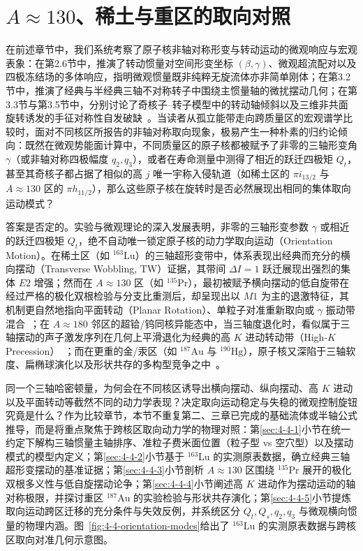 \section{$A\approx 130$、稀土与重区的取向对照}\label{sec:4-4}

在前述章节中，我们系统考察了原子核非轴对称形变与转动运动的微观响应与宏观表象：在第2.6节中，推演了转动惯量对空间形变坐标 $(\beta, \gamma)$、微观超流配对以及四极冻结场的多体响应，指明微观惯量既非纯粹无旋流体亦非简单刚体；在第3.2节中，推演了经典与半经典三轴不对称转子中围绕主惯量轴的微扰摆动几何；在第3.3节与第3.5节中，分别讨论了奇核子--转子模型中的转动轴倾斜以及三维非共面旋转诱发的手征对称性自发破缺~\cite{book-bohr-mottelson-nuclear-structure-vol2,frauendorf-2001-spontaneous-symmetry-breaking-rotating-nuclei}。当读者从孤立能带走向跨质量区的宏观谱学比较时，面对不同核区所报告的非轴对称取向现象，极易产生一种朴素的归约论倾向：既然在微观势能面计算中，不同质量区的原子核都被赋予了非零的三轴形变角 $\gamma$（或非轴对称四极幅度 $q_2, q_3$），或者在寿命测量中测得了相近的跃迁四极矩 $Q_t$，甚至其奇核子都占据了相似的高 $j$ 唯一宇称入侵轨道（如稀土区的 $\pi i_{13/2}$ 与 $A\approx 130$ 区的 $\pi h_{11/2}$），那么这些原子核在旋转时是否必然展现出相同的集体取向运动模式？

答案是否定的。实验与微观理论的深入发展表明，非零的三轴形变参数 $\gamma$ 或相近的跃迁四极矩 $Q_t$，绝不自动唯一锁定原子核的动力学取向运动（Orientation Motion）。在稀土区（如 $^{163}\mathrm{Lu}$）的三轴超形变带中，体系表现出经典而充分的横向摆动（Transverse Wobbling, TW）证据，其带间 $\Delta I = 1$ 跃迁展现出强烈的集体 $E2$ 增强；然而在 $A\approx 130$ 区（如 $^{135}\mathrm{Pr}$），最初被赋予横向摆动的低自旋带在经过严格的极化双根检验与分支比重测后，却呈现出以 $M1$ 为主的退激特征，其机制更自然地指向平面转动（Planar Rotation）、单粒子对准重新取向或 $\gamma$ 振动带混合~\cite{lv-2022-evidence-against-wobbling-135pr}；在 $A\approx 180$ 邻区的超铪/钨同核异能态中，当三轴度退化时，看似属于三轴摆动的声子激发序列在几何上平滑退化为经典的高 $K$ 进动转动带（High-$K$ Precession）~\cite{shimizu-2005-high-k-precession}；而在更重的金/汞区（如 $^{187}\mathrm{Au}$ 与 $^{190}\mathrm{Hg}$），原子核又深陷于三轴软度、扁椭球演化以及形状共存的多构型竞争之中~\cite{guo-2022-low-spin-wobbling-187au}。

同一个三轴哈密顿量，为何会在不同核区诱导出横向摆动、纵向摆动、高 $K$ 进动以及平面转动等截然不同的动力学表现？决定取向运动稳定与失稳的微观控制旋钮究竟是什么？作为比较章节，本节不重复第二、三章已完成的基础流体或半轴公式推导，而是将重点聚焦于跨核区取向动力学的物理对照：第\ref{sec:4-4-1}小节在统一约定下解构三轴惯量主轴排序、准粒子费米面位置（粒子型 vs 空穴型）以及摆动模式的模型内定义；第\ref{sec:4-4-2}小节基于 $^{163}\mathrm{Lu}$ 的实测原表数据，确立经典三轴超形变摆动的基准证据；第\ref{sec:4-4-3}小节剖析 $A\approx 130$ 区围绕 $^{135}\mathrm{Pr}$ 展开的极化双根多义性与低自旋摆动论争；第\ref{sec:4-4-4}小节阐述高 $K$ 进动作为摆动运动的轴对称极限，并探讨重区 $^{187}\mathrm{Au}$ 的实验检验与形状共存演化；第\ref{sec:4-4-5}小节提炼取向运动跨区迁移的充分条件与失效反例，并系统区分 $Q_t, Q_s, q_2, q_3$ 与微观横向惯量的物理内涵。图~\ref{fig:4-4-orientation-modes}给出了 $^{163}\mathrm{Lu}$ 的实测原表数据与跨核区取向对准几何示意图。

